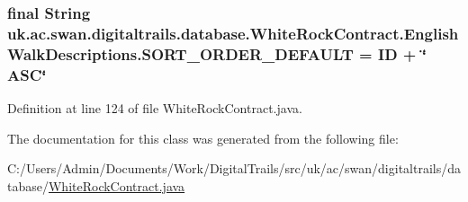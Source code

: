 \hypertarget{classuk_1_1ac_1_1swan_1_1digitaltrails_1_1database_1_1_white_rock_contract_1_1_english_walk_descriptions_af6874dad863648dc025e8b159cd1102d}{
\subsubsection[{S\+O\+R\+T\+\_\+\+O\+R\+D\+E\+R\+\_\+\+D\+E\+F\+A\+U\+L\+T}]{\setlength{\rightskip}{0pt plus 5cm}final String uk.\+ac.\+swan.\+digitaltrails.\+database.\+White\+Rock\+Contract.\+English\+Walk\+Descriptions.\+S\+O\+R\+T\+\_\+\+O\+R\+D\+E\+R\+\_\+\+D\+E\+F\+A\+U\+L\+T = I\+D + \char`\"{} A\+S\+C\char`\"{}\hspace{0.3cm}{\ttfamily [static]}}}\label{classuk_1_1ac_1_1swan_1_1digitaltrails_1_1database_1_1_white_rock_contract_1_1_english_walk_descriptions_af6874dad863648dc025e8b159cd1102d}


Definition at line 124 of file White\+Rock\+Contract.\+java.



The documentation for this class was generated from the following file\+:\begin{DoxyCompactItemize}
\item 
C\+:/\+Users/\+Admin/\+Documents/\+Work/\+Digital\+Trails/src/uk/ac/swan/digitaltrails/database/\hyperlink{_white_rock_contract_8java}{White\+Rock\+Contract.\+java}\end{DoxyCompactItemize}

